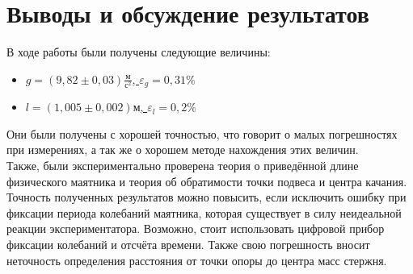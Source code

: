 \documentclass[a4paper,12pt]{article} %
\begin{document}
\section{Выводы и обсуждение результатов}

В ходе работы были получены следующие величины:
\begin{itemize}
	\item \underline{$ g = \left( 9,82\pm0,03\right) \frac{\text{м}}{\text{с}^2} $, $ \varepsilon_g=0,31\% $}
	\item \underline{$ l = \left( 1,005\pm0,002\right) \text{м} $, $ \varepsilon_l=0,2\% $}
\end{itemize}
Они были получены с хорошей точностью, что говорит о малых погрешностях при измерениях, а так же о хорошем методе нахождения этих величин.\\
Также, были экспериментально проверена теория о приведённой длине физического маятника и теория об обратимости точки подвеса и центра качания.
Точность полученных результатов можно повысить, если исключить ошибку при фиксации периода колебаний маятника, которая существует в силу неидеальной реакции экспериментатора. Возможно, стоит использовать цифровой прибор фиксации колебаний и отсчёта времени. Также свою погрешность вносит неточность определения расстояния от точки опоры до центра масс стержня.
\end{document}
